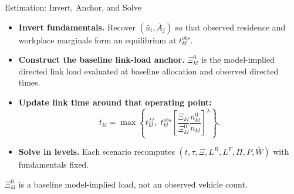 \documentclass[11pt,aspectratio=169]{beamer}
\begin{document}
\begin{frame}{Estimation: Invert, Anchor, and Solve}
\begin{itemize}\small
  \item \textbf{Invert fundamentals.} Recover $(\bar u_i,\bar A_j)$ so that observed residence and workplace marginals form an equilibrium at $t_{kl}^{obs}$.
  \item \textbf{Construct the baseline link-load anchor.} $\Xi_{kl}^{0}$ is the model-implied directed link load evaluated at baseline allocation and observed directed times.
  \item \textbf{Update link time around that operating point:}
  \vspace{-0.45em}\begin{equation}\label{eq:anchor}
    t_{kl}=\max\!\left\{
    t_{kl}^{ff},\;
    t_{kl}^{obs}
    \left[
    \frac{\Xi_{kl}}{\Xi_{kl}^{0}}
    \frac{n_{kl}^{0}}{n_{kl}}
    \right]^{\lambda}
    \right\}.
  \end{equation}
  \vspace{-0.65em}
  \item \textbf{Solve in levels.} Each scenario recomputes $(t,\tau,\Xi,L^R,L^F,\Pi,P,\bar W)$ with fundamentals fixed.
\end{itemize}
\vspace{-0.25em}
\begin{center}\footnotesize
$\Xi_{kl}^{0}$ is a baseline model-implied load, not an observed vehicle count.
\end{center}
\end{frame}
\end{document}

